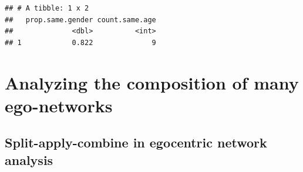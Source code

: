 \documentclass[
]{book}
\begin{document}
\begin{verbatim}
## # A tibble: 1 x 2
##   prop.same.gender count.same.age
##              <dbl>          <int>
## 1            0.822              9
\end{verbatim}

\hypertarget{comp-many}{%
\section{Analyzing the composition of many ego-networks}\label{comp-many}}

\hypertarget{split-apply-combine-in-egocentric-network-analysis}{%
\subsection{Split-apply-combine in egocentric network analysis}\label{split-apply-combine-in-egocentric-network-analysis}}
\end{document}
